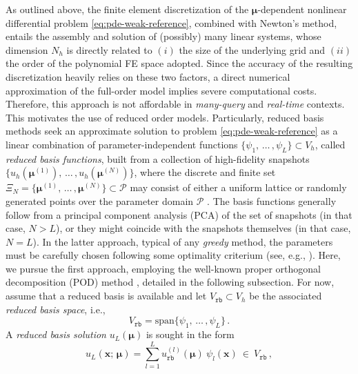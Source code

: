 \documentclass[longtitle]{elsarticle}
\numberwithin{equation}{section}
\theoremstyle{theorem}
\theoremstyle{definition}
\theoremstyle{remark}
\theoremstyle{proposition}
\numberwithin{figure}{section}
\newcommand{\bg}[1]{\boldsymbol{#1}}
\begin{document}
		As outlined above, the finite element discretization of the $\bg{\mu}$-dependent nonlinear differential problem \eqref{eq:pde-weak-reference}, combined with Newton's method, entails the assembly and solution of (possibly) many linear systems, whose dimension $N_h$ is directly related to $(i)$ the size of the underlying grid and $(ii)$ the order of the polynomial FE space adopted. Since the accuracy of the resulting discretization heavily relies on these two factors, a direct numerical approximation of the full-order model implies severe computational costs. Therefore, this approach is not affordable in \emph{many-query} and \emph{real-time} contexts. This motivates the use of reduced order models. Particularly, reduced basis methods seek an approximate solution to problem \eqref{eq:pde-weak-reference} as a linear combination of parameter-independent functions $\big\lbrace \psi_1, \, \ldots \, , \psi_L \big\rbrace \subset V_h$, called \emph{reduced basis functions}, built from a collection of high-fidelity snapshots $\big\lbrace u_h \left( \bg{\mu}^{(1)} \right), \, \ldots \, , u_h \left( \bg{\mu}^{(N)} \right) \big\rbrace$, where the discrete and finite set $\Xi_N = \big\lbrace \bg{\mu}^{(1)}, \, \ldots \, , \bg{\mu}^{(N)} \big\rbrace \subset \mathcal{P}$ may consist of either a uniform lattice or randomly generated points over the parameter domain $\mathcal{P}$ \cite{HSR16}. The basis functions  generally follow from a principal component analysis (PCA) of the set of snapshots (in that case, $N > L$), or they might coincide with the snapshots themselves (in that case, $N = L$). In the latter approach, typical of any \emph{greedy} method, the parameters \smash{$\big\lbrace \bg{\mu}^{(n)} \big\rbrace_{1 \leq n \leq N}$} must be carefully chosen following some optimality criterium (see, e.g., \cite{Chen17}). Here, we pursue the first approach, employing the well-known proper orthogonal decomposition (POD) method \cite{Lia02, Vol08}, detailed in the following subsection. For now, assume that a reduced basis is available and let $V_{\texttt{rb}} \subset V_h$ be the associated \emph{reduced basis space}, i.e.,
		\begin{equation*}
			V_{\texttt{rb}} = \text{span} \big\lbrace \psi_1, \, \ldots \, , \psi_L \big\rbrace \, .
		\end{equation*} 
		A \emph{reduced basis solution} $u_{L}(\bg{\mu})$ is sought in the form
		\begin{equation*}
			\label{eq:rb-solution}
			u_{L}(\bg{x}; \, \bg{\mu}) = \sum_{l = 1}^L u_{\texttt{rb}}^{(l)}(\bg{\mu}) ~ \psi_l(\bg{x}) ~ \in ~ V_{\texttt{rb}} \, ,
		\end{equation*}
\end{document}
